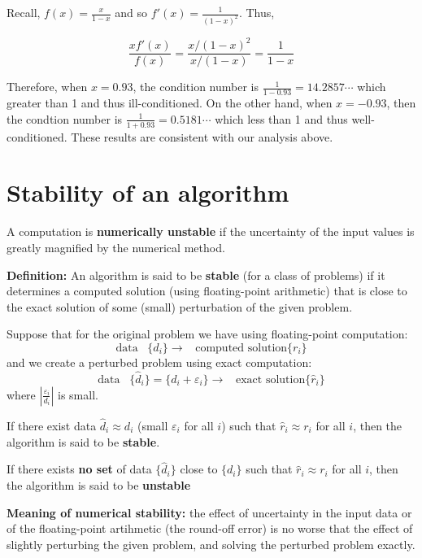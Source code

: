 \documentclass [titlepage,12pt,letter] {article}
\begin{document}
Recall, $f(x)=\frac{x}{1-x}$ and so $f'(x)=\frac{1}{(1-x)^2}$. Thus,

\[
\frac{xf'(x)}{f(x)}=\frac{x/(1-x)^2}{x/(1-x)}=\frac{1}{1-x}
\]

Therefore, when $x=0.93$, the condition number is $\frac{1}{1-0.93}=14.2857\cdots$ which greater than 1 and thus ill-conditioned. On the other hand, when $x=-0.93$, then the condtion number is $\frac{1}{1+0.93}=0.5181\cdots$ which less than 1 and thus well-conditioned. These results are consistent with our analysis above.

\section{Stability of an algorithm} 

A computation is {\bf numerically unstable} if the uncertainty of the input values is greatly magnified by the numerical method. 

\noindent 
{\bf Definition:} An algorithm is said to be {\bf stable} (for a class
of problems) if it determines a computed solution (using
floating-point arithmetic) that is close to the exact solution of some
(small) perturbation of the given problem.

\medskip 
\noindent 
Suppose that for the original problem we have using floating-point computation: 
\[
\mbox{data} \;\;\; \{d_i\} \rightarrow  \;\;\; \mbox{computed solution} \{r_i\}
\] 
and we create a perturbed problem using exact computation: 
\[ 
\mbox{data} \;\;\; \{\hat d_i\}=\{d_i+\varepsilon_i\} \rightarrow \;\;\; \mbox{exact solution} \{\hat r_i\}
\]
\noindent 
where $|\frac{\varepsilon_i}{d_i}|$ is small. 

If there exist data $\hat d_i \approx d_i$ (small $\varepsilon_i$ for all $i$) such that $\hat r_i \approx r_i$ for all $i$, then the algorithm is said to be {\bf stable}. 

If there exists {\bf no set} of data $\{ \hat d_i\}$ close to $\{ d_i \}$ such that $\hat r_i \approx r_i$ for all $i$, then the algorithm is said to be {\bf unstable} 

{\bf Meaning of numerical stability:} the effect of uncertainty in the input data or of the floating-point artihmetic (the round-off error) is no worse that the effect of slightly perturbing the given problem, and solving the perturbed problem exactly. 
\end{document}
